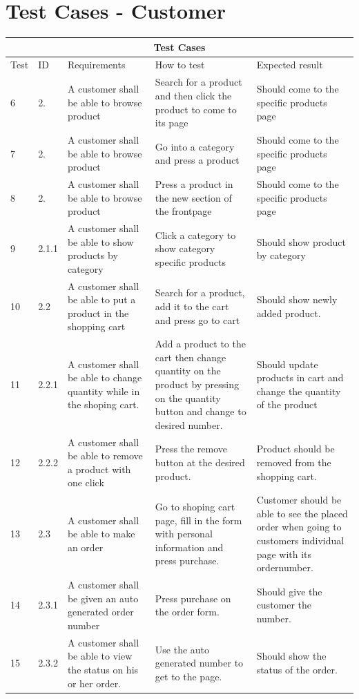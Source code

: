 \documentclass[a4paper,12pt]{article}
\begin{document}
	\section{Test Cases - Customer}
\begin{tabular}{ |p{0.8cm}|p{0.8cm}|p{3.8cm}|p{3.8cm}|p{3.8cm}|  }
	\hline
	\multicolumn{5}{|c|}{Test Cases} \\
	\hline
	Test& ID &Requirements &How to test&Expected result\\
	\hline

	6    & 2. &A customer shall be able to browse product  & Search for a product and then click the product to come to its page & Should come to the specific products page\\
	\hline
	7    & 2. &A customer shall be able to browse product  & Go into a category and press a product & Should come to the specific products page\\ \hline
		8    & 2. &A customer shall be able to browse product  & Press a product in the new section of the frontpage  & Should come to the specific products page\\
	\hline
	9 &2.1.1& A customer shall be able to show products by category  & Click a category to show category specific products   & Should show product by category \\
	\hline
	10 & 2.2 &A customer shall be able to put a product in the shopping cart & Search for a product, add it to the cart and press go to cart & Should show newly added product. \\
	\hline
	 11 &2.2.1& A customer shall be able to change quantity while in the shoping cart. & Add a product to the cart then change quantity on the product by pressing on the quantity button and change to desired number. & Should update products in cart and change the quantity of the product \\
	\hline
	12 &	2.2.2 &A customer shall be able to remove a product with one click& Press the remove button at the desired product. & Product should be removed from the shopping cart. \\
	\hline
	 13 &2.3 &A customer shall be able to make an order & Go to shoping cart page, fill in the form with personal information and press purchase. & Customer should be able to see the placed order when going to customers individual page with its ordernumber.\\
	\hline
	 14 &2.3.1 & A customer shall be given an auto generated order number & Press purchase on the order form. & Should give the customer the number. \\
	
	\hline
	 15 &2.3.2 &A customer shall be able to view the status on his or her order. & Use the auto generated number to get to the page. & Should show the status of the order. \\
	\hline
	
\end{tabular}
\end{document}
